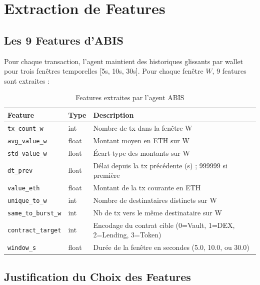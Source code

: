 \documentclass[12pt,a4paper]{report}
\newcommand{\code}[1]{\texttt{#1}}
\begin{document}
\section{Extraction de Features}

\subsection{Les 9 Features d'ABIS}

Pour chaque transaction, l'agent maintient des historiques glissants par wallet pour trois fenêtres temporelles [5s, 10s, 30s]. Pour chaque fenêtre $W$, 9 features sont extraites :

\begin{table}[H]
\centering
\caption{Features extraites par l'agent ABIS}
\label{tab:features}
\begin{tabularx}{\linewidth}{L{4cm} C{2cm} L{7cm}}
\toprule
\textbf{Feature} & \textbf{Type} & \textbf{Description} \\
\midrule
\code{tx\_count\_w} & int & Nombre de tx dans la fenêtre W \\
\code{avg\_value\_w} & float & Montant moyen en ETH sur W \\
\code{std\_value\_w} & float & Écart-type des montants sur W \\
\code{dt\_prev} & float & Délai depuis la tx précédente (s) ; 999999 si première \\
\code{value\_eth} & float & Montant de la tx courante en ETH \\
\code{unique\_to\_w} & int & Nombre de destinataires distincts sur W \\
\code{same\_to\_burst\_w} & int & Nb de tx vers le même destinataire sur W \\
\code{contract\_target} & int & Encodage du contrat cible (0=Vault, 1=DEX, 2=Lending, 3=Token) \\
\code{window\_s} & float & Durée de la fenêtre en secondes (5.0, 10.0, ou 30.0) \\
\bottomrule
\end{tabularx}
\end{table}

\subsection{Justification du Choix des Features}
\end{document}
